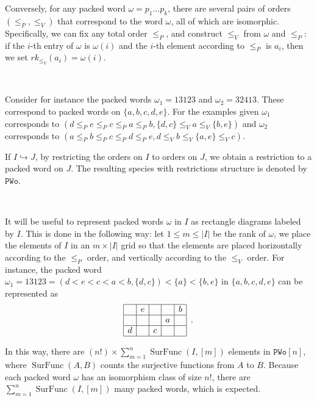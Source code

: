 \documentclass[12pt, reqno]{amsart}
\theoremstyle{definition}
\DeclareMathOperator{\sFunc}{\mathrm{SurFunc}}
\begin{document}
Conversely, for any packed word $\omega = p_1\dots p_k$, there are several pairs of orders $(\leq_P, \leq_V)$ that correspond to the word $\omega $, all of which are isomorphic.
Specifically, we can fix any total order $\leq_P$, and construct $\leq_V$ from $\omega $ and $\leq_P$: if the $i$-th entry of $\omega$ is $\omega(i)$ and the $i$-th element according to $\leq_P$ is $a_i$, then we set $rk_{\leq_V}(a_i) = \omega(i)$.

\

Consider for instance the packed words $\omega_1 = 13123$ and $\omega_2 = 32413$.
These correspond to packed words on $\{a, b, c, d, e\}$.
For the examples given $\omega_1$ corresponds to $(d \leq_P e \leq_P c \leq_P a \leq_P b, \{d, c\} \leq_V a \leq_V \{b, e\} )$ and $\omega_2$ corresponds to $(a \leq_P b \leq_P c \leq_P d \leq_P e, d \leq_V b \leq_V \{a, e\} \leq_V c )$.


If $I \hookrightarrow J$, by restricting the orders on $I$ to orders on $J$, we obtain a restriction to a packed word on $J$.
The resulting species with restrictions structure is denoted by $\mathtt{PWo}$.

\

It will be useful to represent packed words $\omega $ in $I$ as rectangle diagrams labeled by $I$.
This is done in the following way: let $1\leq m \leq |I|$ be the rank of $\omega$, we place the elements of $I$ in an $m \times |I|$ grid so that the elements are placed horizontally according to the $\leq_P$ order, and vertically according to the $\leq_V$ order.
For instance, the packed word $\omega_1 = 13123 = ( d < e < c < a < b, \{d, c\}) < \{a\} < \{b, e\}$ in $\{a, b, c, d, e\}$ can be represented as 
\begin{equation}
\begin{array}{|c|c|c|c|c|}
	\hline   & e &   &   & b \\
    \hline   &   &   & a &   \\
    \hline d &   & c &   &   \\
    \hline 
\end{array}\, \, \, .
\end{equation}




In this way, there are $(n!) \times \sum_{m = 1}^n \sFunc(I, [m])$ elements in $\mathtt{PWo}[n]$, where $\sFunc(A, B)$ counts the surjective functions from $A$ to $B$.
Because each packed word $\omega $ has an isomorphism class of size $n!$, there are $ \sum_{m = 1}^n \sFunc(I, [m])$ many packed words, which is expected.
\end{document}
